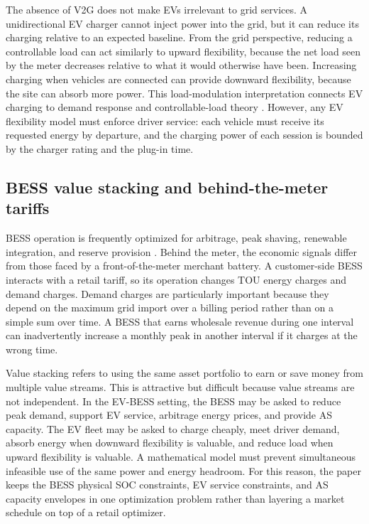 \documentclass[final,5p,times]{elsarticle}
\begin{document}
The absence of V2G does not make EVs irrelevant to grid services. A unidirectional EV charger cannot inject power into the grid, but it can reduce its charging relative to an expected baseline. From the grid perspective, reducing a controllable load can act similarly to upward flexibility, because the net load seen by the meter decreases relative to what it would otherwise have been. Increasing charging when vehicles are connected can provide downward flexibility, because the site can absorb more power. This load-modulation interpretation connects EV charging to demand response and controllable-load theory \cite{callaway2011achieving,siano2014demand}. However, any EV flexibility model must enforce driver service: each vehicle must receive its requested energy by departure, and the charging power of each session is bounded by the charger rating and the plug-in time.

\subsection{BESS value stacking and behind-the-meter tariffs}
BESS operation is frequently optimized for arbitrage, peak shaving, renewable integration, and reserve provision \cite{parisio2014model,wang2018predictive,ghosh2022battery,liu2022battery}. Behind the meter, the economic signals differ from those faced by a front-of-the-meter merchant battery. A customer-side BESS interacts with a retail tariff, so its operation changes TOU energy charges and demand charges. Demand charges are particularly important because they depend on the maximum grid import over a billing period rather than on a simple sum over time. A BESS that earns wholesale revenue during one interval can inadvertently increase a monthly peak in another interval if it charges at the wrong time.

Value stacking refers to using the same asset portfolio to earn or save money from multiple value streams. This is attractive but difficult because value streams are not independent. In the EV-BESS setting, the BESS may be asked to reduce peak demand, support EV service, arbitrage energy prices, and provide AS capacity. The EV fleet may be asked to charge cheaply, meet driver demand, absorb energy when downward flexibility is valuable, and reduce load when upward flexibility is valuable. A mathematical model must prevent simultaneous infeasible use of the same power and energy headroom. For this reason, the paper keeps the BESS physical SOC constraints, EV service constraints, and AS capacity envelopes in one optimization problem rather than layering a market schedule on top of a retail optimizer.
\end{document}
